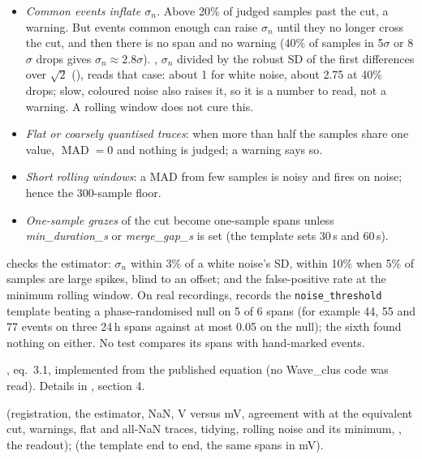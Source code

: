 \begin{itemize}
\item \emph{Common events inflate $\sigma_n$.} Above 20\% of judged samples past the cut, a
  warning. But events common enough can raise $\sigma_n$ until they no longer cross the cut, and
  then there is no span and no warning (40\% of samples in 5$\sigma$ or 8$\sigma$ drops gives
  $\sigma_n \approx 2.8\sigma$). , $\sigma_n$ divided by the robust SD of the first differences
  over $\sqrt2$ (), reads that case: about 1 for white noise, about 2.75 at 40\% drops; slow, coloured noise also
  raises it, so it is a number to read, not a warning. A rolling window does not cure this.
\item \emph{Flat or coarsely quantised traces}: when more than half the samples share one value,
  $\operatorname{MAD} = 0$ and nothing is judged; a warning says so.
\item \emph{Short rolling windows}: a MAD from few samples is noisy and fires on noise; hence
  the 300-sample floor.
\item \emph{One-sample grazes} of the cut become one-sample spans unless
  \emph{min\_duration\_s} or \emph{merge\_gap\_s} is set (the template sets 30\,s and 60\,s).
\end{itemize}

 checks the estimator: $\sigma_n$ within 3\% of a
white noise's SD, within 10\% when 5\% of samples are large spikes, blind to an offset; and the
false-positive rate at the minimum rolling window. On real recordings,
 records the \texttt{noise\_threshold}
template beating a phase-randomised null on 5 of 6 spans (for example 44, 55 and 77 events on
three 24\,h spans against at most 0.05 on the null); the sixth found nothing on either. No test
compares its spans with hand-marked events.

\citet{quianquiroga2004unsupervised}, eq.~3.1, implemented from the published equation (no
Wave\_clus code was read). Details in ,
section 4.

 (registration, the estimator, NaN, V versus mV,
agreement with  at the equivalent cut, warnings, flat and
all-NaN traces, tidying, rolling noise and its minimum, , the readout);
 (the template end to end, the same spans in mV).
